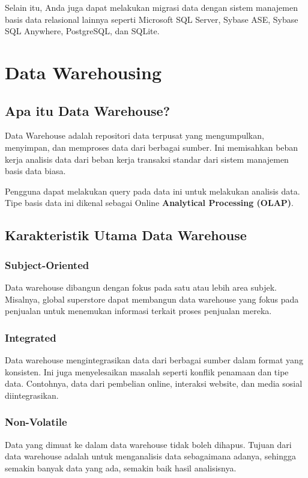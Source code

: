 \documentclass{article}
\begin{document}
Selain itu, Anda juga dapat melakukan migrasi data dengan sistem manajemen basis data relasional lainnya seperti Microsoft SQL Server, Sybase ASE, Sybase SQL Anywhere, PostgreSQL, dan SQLite.





\newpage

\section{Data Warehousing}
\subsection{Apa itu Data Warehouse?}
Data Warehouse adalah repositori data terpusat yang mengumpulkan, menyimpan, dan memproses data dari berbagai sumber. Ini memisahkan beban kerja analisis data dari beban kerja transaksi standar dari sistem manajemen basis data biasa.

Pengguna dapat melakukan query pada data ini untuk melakukan analisis data. Tipe basis data ini dikenal sebagai Online \textbf{Analytical Processing (OLAP)}.

\subsection{Karakteristik Utama Data Warehouse}
\subsubsection{Subject-Oriented}
Data warehouse dibangun dengan fokus pada satu atau lebih area subjek. Misalnya, global superstore dapat membangun data warehouse yang fokus pada penjualan untuk menemukan informasi terkait proses penjualan mereka.

\subsubsection{Integrated}
Data warehouse mengintegrasikan data dari berbagai sumber dalam format yang konsisten. Ini juga menyelesaikan masalah seperti konflik penamaan dan tipe data. Contohnya, data dari pembelian online, interaksi website, dan media sosial diintegrasikan.

\subsubsection{Non-Volatile}
Data yang dimuat ke dalam data warehouse tidak boleh dihapus. Tujuan dari data warehouse adalah untuk menganalisis data sebagaimana adanya, sehingga semakin banyak data yang ada, semakin baik hasil analisisnya.
\end{document}
